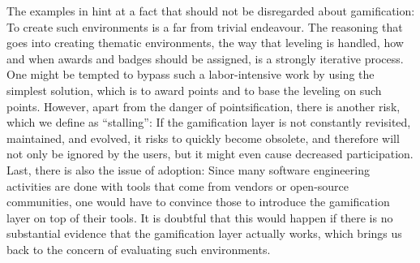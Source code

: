 The examples in  hint at a fact that should not be disregarded about gamification: To create such environments is a far from trivial endeavour.
The reasoning that goes into creating thematic environments, the way that leveling is handled, how and when awards and badges should be assigned, is a strongly iterative process.
One might be tempted to bypass such a labor-intensive work by using the simplest solution, which is to award points and to base the leveling on such points.
However, apart from the danger of pointsification, there is another risk, which we define as ``stalling'': If the gamification layer is not constantly revisited, maintained, and evolved, it risks to quickly become obsolete, and therefore will not only be ignored by the users, but it might even cause decreased participation.
Last, there is also the issue of adoption: Since many software engineering activities are done with tools that come from vendors or open-source communities, one would have to convince those to introduce the gamification layer on top of their tools.
It is doubtful that this would happen if there is no substantial evidence that the gamification layer actually works, which brings us back to the concern of evaluating such environments.

%
%

